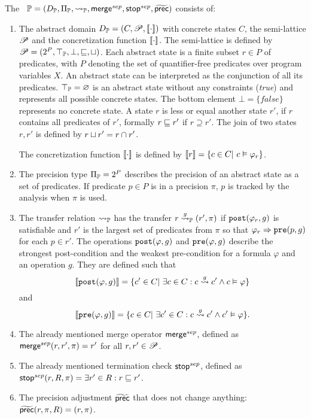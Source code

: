 The \predicateCPA\ $\mathbb{P} = (D_{\mathbb{P}}, \Pi_{\mathbb{P}}, \rightsquigarrow_{\mathbb{P}}, \operatorname{\operatorname{\mathsf{merge}}}^{sep}, \operatorname{\operatorname{\mathsf{stop}}}^{sep}, \operatorname{\widetilde{\operatorname{\operatorname{\mathsf{prec}}}}})$ consists of:
\begin{enumerate}[leftmargin=*, label=\arabic*.]
\item
The abstract domain
	$D_{\mathbb{P}} = (C, \mathscr{P}, \llbracket \cdot \rrbracket)$ with concrete states $C$, the semi-lattice $\mathscr{P}$ and the concretization function $\llbracket \cdot \rrbracket$.
	The semi-lattice is defined by $\mathscr{P} = (2^P, \top_{\mathbb{P}}, \bot, \sqsubseteq, \sqcup)$.
	Each abstract state is a finite subset $r \in P$ of predicates, with $P$ denoting the set of quantifier-free predicates over program variables $X$.
	An abstract state can be interpreted as the conjunction of all its predicates. $\top_{\mathbb{P}} = \varnothing$ is an abstract state without any constraints (\emph{true}) and represents all possible concrete states.
	The bottom element $\bot = \{false\}$ represents no concrete state. A state $r$ is less or equal another state $r'$, if $r$ contains all predicates of $r'$, formally $r \sqsubseteq r'$ if $r \supseteq r'$.
	The join of two states $r, r'$ is defined by $r \sqcup r' = r \cap r'$.

	The concretization function $\llbracket \cdot \rrbracket$ is defined by $\llbracket r \rrbracket = \{ c \in C |\ c \vDash \varphi_r\}$.

\item
The precision type $\Pi_{\mathbb{P}} = 2^P$ describes the precision of an abstract state as a set of predicates. If predicate $p \in P$ is in a precision $\pi$, $p$ is tracked by the analysis when $\pi$ is used.

\item
The transfer relation $\rightsquigarrow_{\mathbb{P}}$ has the transfer $r \overset{g}{\rightsquigarrow}_{\mathbb{P}} (r', \pi)$ if $\texttt{post}(\varphi_r, g)$ is satisfiable
	and $r'$ is the largest set of predicates from $\pi$ so that $\varphi_r \Rightarrow \texttt{pre}(p, g)$ for each $p \in r'$.
	The operations $\texttt{post}(\varphi, g)$ and $\texttt{pre}(\varphi, g)$ describe the strongest post-condition and the weakest pre-condition for a formula $\varphi$ and an operation $g$.
	They are defined such that
	\[\llbracket \texttt{post}(\varphi, g) \rrbracket = \{c' \in C |\ \exists c \in C : c \overset{g}{\rightsquigarrow} c' \wedge c \vDash \varphi \}\] and
	\[\llbracket \texttt{pre}(\varphi, g) \rrbracket = \{c \in C |\ \exists c' \in C : c \overset{g}{\rightsquigarrow} c' \wedge c' \vDash \varphi \}.\]

\item
The already mentioned merge operator $\operatorname{\operatorname{\mathsf{merge}}}^{sep}$, defined as $\operatorname{\operatorname{\mathsf{merge}}}^{sep}(r, r', \pi) = r'$ for all $r, r' \in \mathscr{P}$.

\item
The already mentioned termination check $\operatorname{\operatorname{\mathsf{stop}}}^{sep}$, defined as $\operatorname{\operatorname{\mathsf{stop}}}^{sep}(r, R, \pi) = \exists r' \in R : r \sqsubseteq r'$.

\item
The precision adjustment $\operatorname{\widetilde{\operatorname{\operatorname{\mathsf{prec}}}}}$ that does not change anything: $\operatorname{\widetilde{\operatorname{\operatorname{\mathsf{prec}}}}}(r, \pi, R) = (r, \pi)$.

\end{enumerate}

